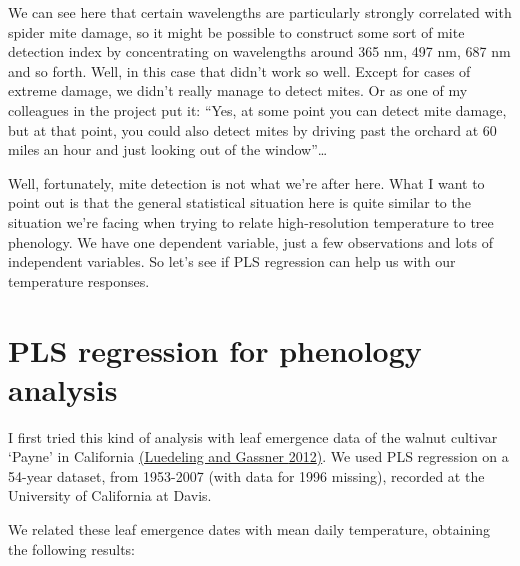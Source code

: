 \documentclass[
]{book}
\begin{document}
We can see here that certain wavelengths are particularly strongly correlated with spider mite damage, so it might be possible to construct some sort of mite detection index by concentrating on wavelengths around 365 nm, 497 nm, 687 nm and so forth. Well, in this case that didn't work so well. Except for cases of extreme damage, we didn't really manage to detect mites. Or as one of my colleagues in the project put it: ``Yes, at some point you can detect mite damage, but at that point, you could also detect mites by driving past the orchard at 60 miles an hour and just looking out of the window''\ldots{}

Well, fortunately, mite detection is not what we're after here. What I want to point out is that the general statistical situation here is quite similar to the situation we're facing when trying to relate high-resolution temperature to tree phenology. We have one dependent variable, just a few observations and lots of independent variables. So let's see if PLS regression can help us with our temperature responses.

\hypertarget{pls-regression-for-phenology-analysis}{%
\section{PLS regression for phenology analysis}\label{pls-regression-for-phenology-analysis}}

I first tried this kind of analysis with leaf emergence data of the walnut cultivar `Payne' in California \href{https://www.sciencedirect.com/science/article/abs/pii/S0168192312000561}{(Luedeling and Gassner \protect\hyperlink{ref-luedeling2012partial}{2012})}. We used PLS regression on a 54-year dataset, from 1953-2007 (with data for 1996 missing), recorded at the University of California at Davis.

We related these leaf emergence dates with mean daily temperature, obtaining the following results:
\end{document}
